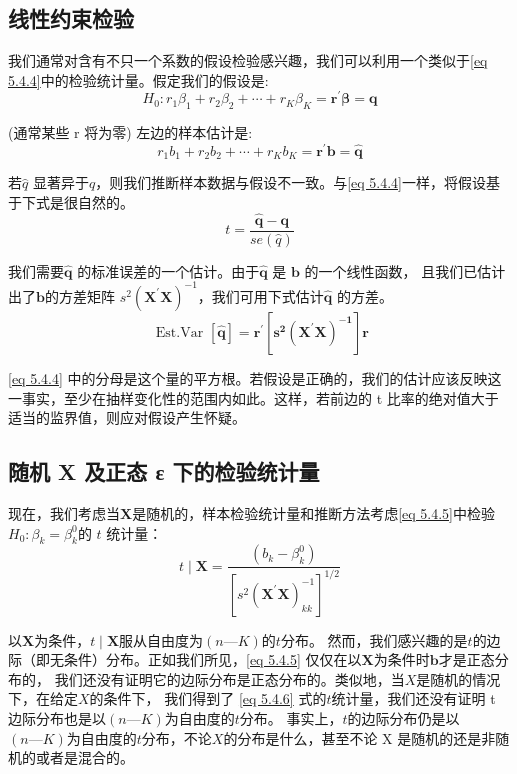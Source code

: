 \subsection{线性约束检验}
我们通常对含有不只一个系数的假设检验感兴趣，我们可以利用一个类似于\ref{eq 5.4.4}中的检验统计量。假定我们的假设是:
$$ H_{0}: r_{1} \beta_{1}+r_{2} \beta_{2}+\cdots+r_{K} \beta_{K}= \boldsymbol{r^{\prime} \beta=q} $$

(通常某些 r 将为零) 左边的样本估计是:
$$ r_{1} b_{1}+r_{2} b_{2}+\cdots+r_{K} b_{K}=\boldsymbol{r^{\prime} b=\hat{q}} $$

若$ \hat{q} $ 显著异于$ q $，则我们推断样本数据与假设不一致。与\ref{eq 5.4.4}一样，将假设基于下式是很自然的。
\begin{equation}
     t=\frac{\boldsymbol{\hat{q}-q}}{s e(\hat{q})} 
     \label{eq 5.4.5}
\end{equation}

我们需要$ \boldsymbol{\hat{q}} $ 的标准误差的一个估计。由于$ \boldsymbol{\hat{q}} $ 是 $ \boldsymbol{b} $ 的一个线性函数，
且我们已估计出了$ \boldsymbol{b} $的方差矩阵 $s^{2} (\boldsymbol{X^{\prime}X})^{-1} $，我们可用下式估计$ \boldsymbol{\hat{q}} $ 的方差。
$$ \text { Est.Var }[\boldsymbol{\hat{q}}]= \boldsymbol{r^{\prime}\left[s^{2}\left(X^{\prime} X\right)^{-1}\right] r } $$

\ref{eq 5.4.4} 中的分母是这个量的平方根。若假设是正确的，我们的估计应该反映这一事实，至少在抽样变化性的范围内如此。这样，若前边的 t 比率的绝对值大于适当的监界值，则应对假设产生怀疑。

\subsection{随机 X 及正态 ε 下的检验统计量}
现在，我们考虑当$ \boldsymbol{X} $是随机的，样本检验统计量和推断方法考虑\ref{eq 5.4.5}中检验 $ H_{0}: \beta_{k}=\beta_{k}^{0} $的 $ t $ 统计量：
\begin{equation}
    t \mid \boldsymbol{X}=\frac{\left(b_{k}-\beta_{k}^{0}\right)}{\left[s^{2}\left(\boldsymbol{X^{\prime} X}\right)_{k k}^{-1}\right]^{1 / 2}}
    \label{eq 5.4.6}
\end{equation}

以$ \boldsymbol{X} $为条件，$ t \mid \boldsymbol{X} $服从自由度为$ (n—K) $的$ t $分布。
然而，我们感兴趣的是$ t $的边际（即无条件）分布。正如我们所见，\ref{eq 5.4.5} 仅仅在以$ \boldsymbol{X} $为条件时$ \boldsymbol{b} $才是正态分布的，
我们还没有证明它的边际分布是正态分布的。类似地，当$ X $是随机的情况下，在给定$ X $的条件下，
我们得到了 \ref{eq 5.4.6} 式的$ t $统计量，我们还没有证明 t 边际分布也是以$ (n—K) $为自由度的$ t $分布。
事实上，$ t $的边际分布仍是以$ (n—K) $为自由度的$ t $分布，不论$ X $的分布是什么，甚至不论
X 是随机的还是非随机的或者是混合的。

